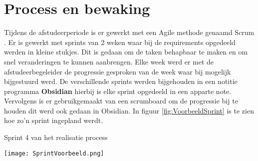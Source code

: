 \section{Process en bewaking}
Tijdens de afstudeerperiode is er gewerkt met een Agile \parencite{Agile} methode genaamd Scrum \Parencite{Scrum}.
Er is gewerkt met sprints van 2 weken waar bij de requirements opgedeeld werden in kleine stukjes.
Dit is gedaan om de taken behapbaar te maken en om snel veranderingen te kunnen aanbrengen.
Elke week werd er met de afstudeerbegeleider de progressie gesproken van de week waar bij mogelijk bijgestuurd werd.
De verschillende sprints werden bijgehouden in een notitie programma \textbf{Obsidian} hierbij is elke sprint opgedeeld in een apparte note.
Vervolgens is er gebruikgemaakt van een scrumboard om de progressie bij te houden dit werd ook gedaan in Obsidian.
In figuur \ref{fig:VoorbeeldSprint} is te zien hoe zo'n sprint ingepland werdt.

\whitespace[2]
\begin{graphic}
	\captionsetup{type=figure}
	\caption{Sprint 4 van het realisatie process}
	\texttt{[image: SprintVoorbeeld.png]}
	\label{fig:VoorbeeldSprint}
\end{graphic}

